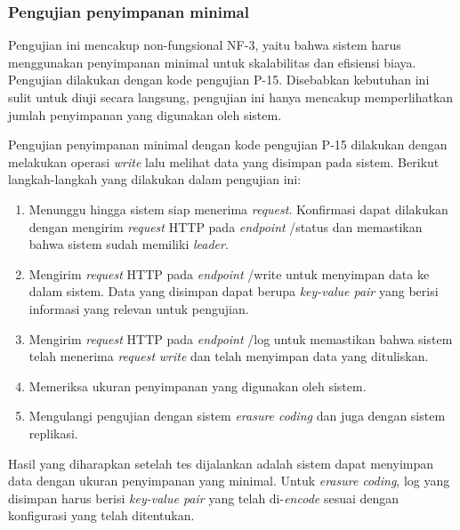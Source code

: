 \subsubsection{Pengujian penyimpanan minimal}
\label{subsubsection:pengujian-penyimpanan-minimal}

Pengujian ini mencakup non-fungsional NF-3, yaitu bahwa sistem harus menggunakan penyimpanan minimal untuk skalabilitas dan efisiensi biaya. Pengujian dilakukan dengan kode pengujian P-15. Disebabkan kebutuhan ini sulit untuk diuji secara langsung, pengujian ini hanya mencakup memperlihatkan jumlah penyimpanan yang digunakan oleh sistem.

Pengujian penyimpanan minimal dengan kode pengujian P-15 dilakukan dengan melakukan operasi \textit{write} lalu melihat data yang disimpan pada sistem. Berikut langkah-langkah yang dilakukan dalam pengujian ini:

\begin{enumerate}
  \item Menunggu hingga sistem siap menerima \textit{request}. Konfirmasi dapat dilakukan dengan mengirim \textit{request} HTTP pada \textit{endpoint} /status dan memastikan bahwa sistem sudah memiliki \textit{leader}.
  \item Mengirim \textit{request} HTTP pada \textit{endpoint} /write untuk menyimpan data ke dalam sistem. Data yang disimpan dapat berupa \textit{key-value pair} yang berisi informasi yang relevan untuk pengujian.
  \item Mengirim \textit{request} HTTP pada \textit{endpoint} /log untuk memastikan bahwa sistem telah menerima \textit{request} \textit{write} dan telah menyimpan data yang dituliskan.
  \item Memeriksa ukuran penyimpanan yang digunakan oleh sistem.
  \item Mengulangi pengujian dengan sistem \textit{erasure coding} dan juga dengan sistem replikasi.
\end{enumerate}

Hasil yang diharapkan setelah tes dijalankan adalah sistem dapat menyimpan data dengan ukuran penyimpanan yang minimal. Untuk \textit{erasure coding}, log yang disimpan harus berisi \textit{key-value pair} yang telah di-\textit{encode} sesuai dengan konfigurasi yang telah ditentukan.